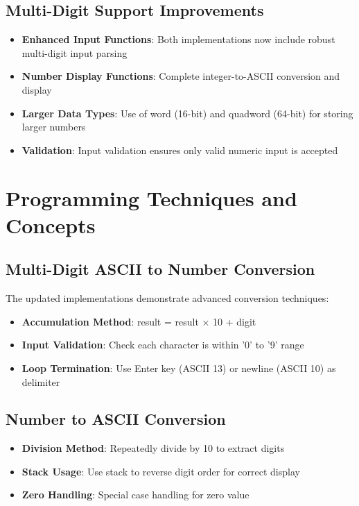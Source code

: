 \documentclass[12pt,a4paper]{article}
\begin{document}
\subsection{Multi-Digit Support Improvements}
\begin{itemize}
\item \textbf{Enhanced Input Functions}: Both implementations now include robust multi-digit input parsing
\item \textbf{Number Display Functions}: Complete integer-to-ASCII conversion and display
\item \textbf{Larger Data Types}: Use of word (16-bit) and quadword (64-bit) for storing larger numbers
\item \textbf{Validation}: Input validation ensures only valid numeric input is accepted
\end{itemize}

\section{Programming Techniques and Concepts}

\subsection{Multi-Digit ASCII to Number Conversion}
The updated implementations demonstrate advanced conversion techniques:
\begin{itemize}
\item \textbf{Accumulation Method}: result = result × 10 + digit
\item \textbf{Input Validation}: Check each character is within '0' to '9' range
\item \textbf{Loop Termination}: Use Enter key (ASCII 13) or newline (ASCII 10) as delimiter
\end{itemize}

\subsection{Number to ASCII Conversion}
\begin{itemize}
\item \textbf{Division Method}: Repeatedly divide by 10 to extract digits
\item \textbf{Stack Usage}: Use stack to reverse digit order for correct display
\item \textbf{Zero Handling}: Special case handling for zero value
\end{itemize}
\end{document}
